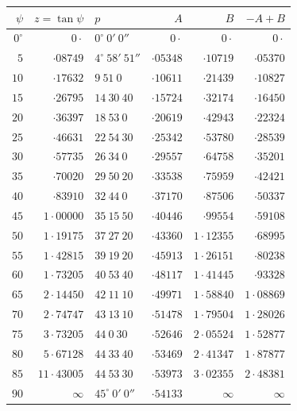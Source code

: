 \documentclass[11pt]{article}
\begin{document}
\medskip
\begin{center}
\begin{tabular}{rrlrrr}
$\psi$ & $z=\tan\psi$ & \hspace{0.5em}$p$ & $A$ & $B$ & $-A+B$\\
\hline
$0^{\circ}$ & $0\cdot$ & $0^{\circ}\ 0'\ 0''$ & $0\cdot$ & $0\cdot$ & $0\cdot$\\
$5$  & $\cdot 08749$  & $4^{\circ}\ 58'\ 51''$  & $\cdot 05348$ & $\cdot 10719$  & $\cdot 05370$\\
$10$ & $\cdot 17632$  & $9\ 51\ 0$              & $\cdot 10611$ & $\cdot 21439$  & $\cdot 10827$\\
$15$ & $\cdot 26795$  & $14\ 30\ 40$            & $\cdot 15724$ & $\cdot 32174$  & $\cdot 16450$\\
$20$ & $\cdot 36397$  & $18\ 53\ 0$             & $\cdot 20619$ & $\cdot 42943$  & $\cdot 22324$\\
$25$ & $\cdot 46631$  & $22\ 54\ 30$            & $\cdot 25342$ & $\cdot 53780$  & $\cdot 28539$\\
$30$ & $\cdot 57735$  & $26\ 34\ 0$             & $\cdot 29557$ & $\cdot 64758$  & $\cdot 35201$\\
$35$ & $\cdot 70020$  & $29\ 50\ 20$            & $\cdot 33538$ & $\cdot 75959$  & $\cdot 42421$\\
$40$ & $\cdot 83910$  & $32\ 44\ 0$             & $\cdot 37170$ & $\cdot 87506$  & $\cdot 50337$\\
$45$ & $1\cdot 00000$ & $35\ 15\ 50$            & $\cdot 40446$ & $\cdot 99554$  & $\cdot 59108$\\
$50$ & $1\cdot 19175$ & $37\ 27\ 20$            & $\cdot 43360$ & $1\cdot 12355$ & $\cdot 68995$\\
$55$ & $1\cdot 42815$ & $39\ 19\ 20$            & $\cdot 45913$ & $1\cdot 26151$ & $\cdot 80238$\\
$60$ & $1\cdot 73205$ & $40\ 53\ 40$            & $\cdot 48117$ & $1\cdot 41445$ & $\cdot 93328$\\
$65$ & $2\cdot 14450$ & $42\ 11\ 10$            & $\cdot 49971$ & $1\cdot 58840$ & $1\cdot 08869$\\
$70$ & $2\cdot 74747$ & $43\ 13\ 10$            & $\cdot 51478$ & $1\cdot 79504$ & $1\cdot 28026$\\
$75$ & $3\cdot 73205$ & $44\ 0\ 30$             & $\cdot 52646$ & $2\cdot 05524$ & $1\cdot 52877$\\
$80$ & $5\cdot 67128$ & $44\ 33\ 40$            & $\cdot 53469$ & $2\cdot 41347$ & $1\cdot 87877$\\
$85$ & $11\cdot 43005$& $44\ 53\ 30$            & $\cdot 53973$ & $3\cdot 02355$ & $2\cdot 48381$\\
$90$ & $\infty$       & $45^{\circ}\ 0'\ 0''$   & $\cdot 54133$ & $\infty$       & $\infty$\\
\end{tabular}
\end{center}
\end{document}
